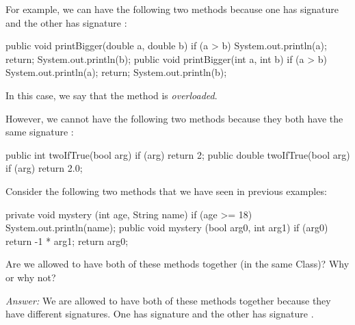For example, we can have the following two methods because
one has signature  and the other
has signature :
\begin{code}
public void printBigger(double a, double b) {
  if (a > b) {
    System.out.println(a);
    return;
  }
  System.out.println(b);
}
public void printBigger(int a, int b) {
  if (a > b) {
    System.out.println(a);
    return;
  }
  System.out.println(b);
}
\end{code}
In this case, we say that the  method is \emph{overloaded}.

However, we cannot have the following two methods because they both have the
same signature :
\begin{code}
public int twoIfTrue(bool arg) {
  if (arg) {
    return 2;
  }
}
public double twoIfTrue(bool arg) {
  if (arg) {
    return 2.0;
  }
}
\end{code}

\begin{example}
Consider the following two methods that we have seen in previous
examples:
\begin{code}
private void mystery (int age, String name) {
  if (age >= 18) {
    System.out.println(name);
  }
}
public void mystery (bool arg0, int arg1) {
  if (arg0) {
    return -1 * arg1;
  }
  return arg0;
}
\end{code}
Are we allowed to have both of these methods together (in the same Class)?
Why or why not?

\noindent \emph{Answer:}
We are allowed to have both of these methods together because they have
different signatures. One has signature 
and the other has signature .
\end{example}

